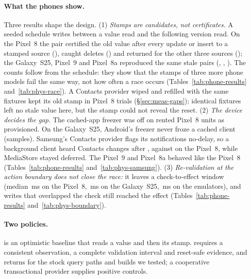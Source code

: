 \paragraph{What the phones show.} Three results shape the design. (1) \emph{Stamps are candidates, not certificates.} A seeded schedule writes between a value read and the following version read. On the Pixel~8 the pair certified the old value after every update or insert to a stamped source (\PhysRaceStampedStale), caught deletes (\PhysRaceDeletesCaught) and returned \Unknown for the other three sources (\PhysRaceStamplessUnknown); the Galaxy~S25, Pixel~9 and Pixel~8a reproduced the same stale pairs (\PhysSamsungRaceStampedStale, \PhysNineRaceStampedStale, \PhysEightARaceStampedStale). The counts follow from the schedule: they show that the stamps of three more phone models fail the same way, not how often a race occurs (Tables~\ref{tab:phone-results} and~\ref{tab:phys-race}). A Contacts provider wiped and refilled with the same fixtures kept its old stamp in \PhysResetSameStamp Pixel~8 trials (\S\ref{sec:meas-gaps}); identical fixtures left no stale value here, but the stamp could not reveal the reset. (2) \emph{The device decides the gap.} The cached-app freezer was off on \PhysFreezerOffTrialUnits rented Pixel~8 units as provisioned. On the Galaxy~S25, Android's freezer never froze a cached client (\PhysSamsungLongAndroidFrozen samples). Samsung's Contacts provider flags its notifications no-delay, so a background client heard Contacts changes after \PhysSamsungBgMedian, against \PhysDeployBgMedian on the Pixel~8, while MediaStore stayed deferred. The Pixel~9 and Pixel~8a behaved like the Pixel~8 (Tables~\ref{tab:phone-results} and~\ref{tab:phys-samsung}). (3) \emph{Re-validation at the action boundary does not close the race:} it leaves a check-to-effect window (median \PhysCteMsInt\,ms on the Pixel~8, \PhysSamsungCteMsInt\,ms on the Galaxy~S25, \CteMsInt\,ms on the emulators), and writes that overlapped the check still reached the effect (Tables~\ref{tab:phone-results} and~\ref{tab:phys-boundary}).

\paragraph{Two policies.} \stamp is an optimistic baseline that reads a value and then its stamp. \sys requires a consistent observation, a complete validation interval and reset-safe evidence, and returns \Unknown for the stock query paths and builds we tested; a cooperative transactional provider supplies positive controls.

